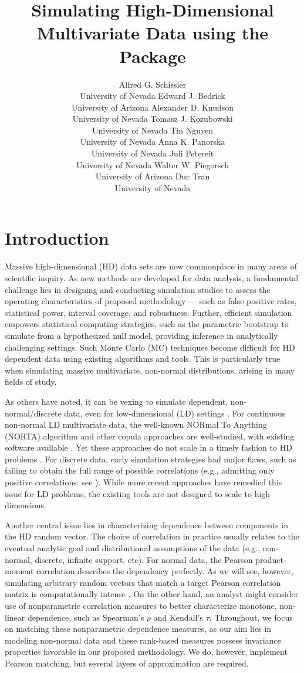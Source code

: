 \documentclass[
]{jss}
\author{
Alfred G. Schissler\\University of Nevada \And Edward J. Bedrick\\University of Arizona \And Alexander D. Knudson\\University of Nevada \AND Tomasz J. Kozubowski\\University of Nevada \And Tin Nguyen\\University of Nevada \And Anna K. Panorska\\University of Nevada \AND Juli Petereit\\University of Nevada \And Walter W. Piegorsch\\University of Arizona \And Duc Tran\\University of Nevada
}
\title{Simulating High-Dimensional Multivariate Data using the \pkg{Bigsimr} Package}
\begin{document}
\clearpage

\hypertarget{introduction}{%
\section{Introduction}\label{introduction}}


Massive high-dimensional (HD) data sets are now commonplace in many areas of scientific inquiry. As new methods are developed for data analysis, a fundamental challenge lies in designing and conducting simulation studies to assess the operating characteristics of proposed methodology --- such as false positive rates, statistical power, interval coverage, and robustness. Further, efficient simulation empowers statistical computing strategies, such as the parametric bootstrap \citep{Chernick2008} to simulate from a hypothesized null model, providing inference in analytically challenging settings. Such Monte Carlo (MC) techniques become difficult for HD dependent data using existing algorithms and tools. This is particularly true when simulating massive multivariate, non-normal distributions, arising in many fields of study.

As others have noted, it can be vexing to simulate dependent, non-normal/discrete data, even for low-dimensional (LD) settings \citep{MB13, XZ19}. For continuous non-normal LD multivariate data, the well-known NORmal To Anything (NORTA) algorithm \citep{Cario1997} and other copula approaches \citep{Nelsen2007} are well-studied, with existing software available \citep{Yan2007, Chen2001}. Yet these approaches do not scale in a timely fashion to HD problems \citep{Li2019gpu}. For discrete data, early simulation strategies had major flaws, such as failing to obtain the full range of possible correlations (e.g., admitting only positive correlations: see \citet{Park1996}). While more recent approaches \citep{MB13, Xia17, BF17} have remedied this issue for LD problems, the existing tools are not designed to scale to high dimensions.

Another central issue lies in characterizing dependence between components in the HD random vector. The choice of correlation in practice usually relates to the eventual analytic goal and distributional assumptions of the data (e.g., non-normal, discrete, infinite support, etc). For normal data, the Pearson product-moment correlation describes the dependency perfectly. As we will see, however, simulating arbitrary random vectors that match a target Pearson correlation matrix is computationally intense \citep{Chen2001, Xia17}. On the other hand, an analyst might consider use of nonparametric correlation measures to better characterize monotone, non-linear dependence, such as Spearman's \(\rho\) and Kendall's \(\tau\). Throughout, we focus on matching these nonparametric dependence measures, as our aim lies in modeling non-normal data and these rank-based measures possess invariance properties favorable in our proposed methodology. We do, however, implement Pearson matching, but several layers of approximation are required.
\end{document}

